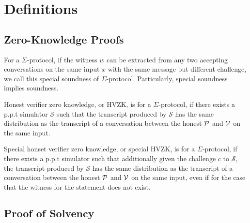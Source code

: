 
\chapter{Definitions}

\section{Zero-Knowledge Proofs}
\label{app:zkp}

\begin{definition}
For a $\Sigma$-protocol, if the witness $w$ can be extracted from any two accepting conversations on the same input $x$ with the same message but different challenge, we call this special soundness of $\Sigma$-protocol. Particularly, special soundness implies soundness.
\end{definition}

\begin{definition}

\end{definition}

\begin{definition}
Honest verifier zero knowledge, or HVZK, is for a $\Sigma$-protocol, if there exists a p.p.t simulator $\mathcal{S}$ such that the transcript produced by $\mathcal{S}$ has the same distribution as the transcript of a conversation between the honest $\mathcal{P}$ and $\mathcal{V}$ on the same input.
\end{definition}

\begin{definition}
Special honset verifier zero knowledge, or special HVZK, is for a $\Sigma$-protocol, if there exists a p.p.t simulator such that additionally given the challenge $c$ to $\mathcal{S}$, the transcript produced by $\mathcal{S}$ has the same distribution as the transcript of a conversation between the honest $\mathcal{P}$ and $\mathcal{V}$ on the same input, even if for the case that the witness for the statement does not exist.
\end{definition}

\section{Proof of Solvency}
\label{app:defs}

